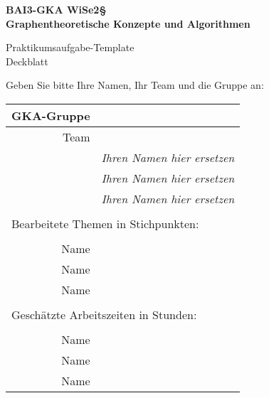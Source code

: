 

\thispagestyle{empty}
\begin{center}

    {\large {\bf   BAI3-GKA WiSe2§ \\ Graphentheoretische Konzepte und Algorithmen \\[5mm]} }
    
{\huge Praktikumsaufgabe-Template  \\[5mm] Deckblatt}\\

\end{center}
Geben Sie bitte Ihre Namen, Ihr Team und die Gruppe  an:\\ 
				\begin{tabular}[t]{|r|l|}
				 \hline
				GKA-Gruppe&                 \raisebox{-3mm}{\rule[8mm]{100mm}{0mm} }\\ \hline    
				Team &                                                        \\ \hline			
				& \textit{Ihren Namen hier ersetzen }               \\ \hline    
				& \textit{Ihren Namen hier ersetzen}               \\ \hline			
				& \textit{Ihren Namen hier ersetzen  }             \\ \hline  			
				\multicolumn{2}{c}{}\\  			
				\multicolumn{2}{l}{Bearbeitete Themen in Stichpunkten:}\\			
				\multicolumn{2}{c}{}\\  \hline
				Name &                \\ \hline    
				Name&                  \\ \hline			
				Name&                \\ \hline 		
				\multicolumn{2}{c}{}\\  			
				\multicolumn{2}{l}{Geschätzte Arbeitszeiten in Stunden:}\\			
				\multicolumn{2}{c}{}\\  \hline
				Name&                 \\ \hline    
				Name&                  \\ \hline			
				Name&                \\ \hline 			
				\end{tabular}
~\\[4mm]
		
		
\vfill

